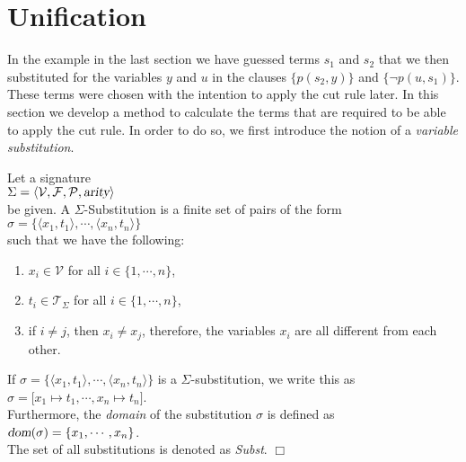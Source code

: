 \section{Unification}
In the example in the last section we have guessed terms $s_1$ and $s_2$ that we then
substituted for the variables
$y$ and $u$ in the clauses $\big\{ p(s_2,y) \big\}$ and  $\big\{\neg p(u,s_1)\big\}$.
These terms were chosen with the intention to apply the cut rule later.
In this section we develop a method to calculate the terms that are required to be able to
apply the cut rule.  In order to do so, we first introduce the notion of a 
\emph{variable substitution}.

\begin{Definition}[Substitution]
Let a signature \\[0.2cm]
\hspace*{1.3cm} $\Sigma = \langle \mathcal{V}, \mathcal{F}, \mathcal{P}, \textsl{arity} \rangle$ \\[0.2cm]
be given.  A  $\Sigma$-Substitution is a finite set of pairs of the form \\[0.2cm]
\hspace*{1.3cm} $\sigma = \bigl\{ \langle x_1, t_1 \rangle, \cdots, \langle x_n, t_n \rangle \bigr\}$ \\[0.2cm]
such that we have the following:
\begin{enumerate}
\item $x_i \in \mathcal{V}$ for all $i \in \{1, \cdots, n \}$,
\item $t_i \in \mathcal{T}_\Sigma$ for all $i \in \{1, \cdots, n \}$,
\item if $i\not=j$, then $x_i \not= x_j$, therefore, the variables $x_i$ are all different
      from each other.
\end{enumerate}

If $\sigma = \bigl\{ \langle x_1, t_1 \rangle, \cdots, \langle x_n, t_n \rangle \bigr\}$
is a $\Sigma$-substitution, we write this as  \\[0.2cm]
\hspace*{1.3cm} $\sigma = \bigl[ x_1 \mapsto t_1, \cdots, x_n \mapsto t_n \bigr]$.  \\[0.2cm]
Furthermore, the  \emph{domain} of the substitution $\sigma$ is defined as  \\[0.2cm]
\hspace*{1.3cm} $\textsl{dom}(\sigma) = \{ x_1, \cdots, x_n\}$.
\\[0.2cm]
The set of all substitutions is denoted as \textsl{Subst}.
\hspace*{\fill} $\Box$
\end{Definition}

